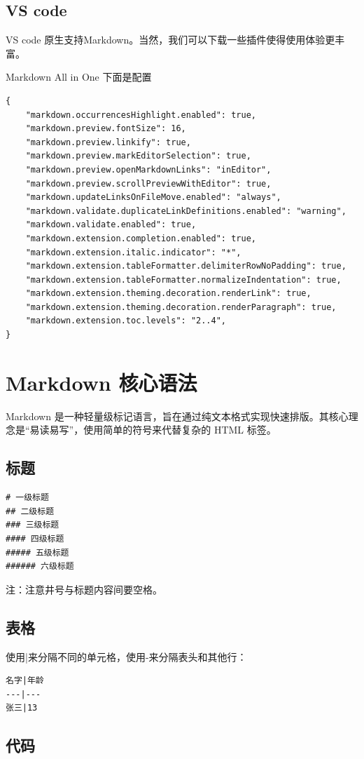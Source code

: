 \documentclass[10pt,a4paper]{book}
\theoremstyle{thmstyle} %
\theoremstyle{defstyle} %
\theoremstyle{prostyle} %
\begin{document}
	\section{VS code}
	VS code 原生支持Markdown。当然，我们可以下载一些插件使得使用体验更丰富。
	\begin{mybox}{Markdown All in One}
			下面是配置
			\begin{lstlisting}
{
	"markdown.occurrencesHighlight.enabled": true,
	"markdown.preview.fontSize": 16,
	"markdown.preview.linkify": true,
	"markdown.preview.markEditorSelection": true,
	"markdown.preview.openMarkdownLinks": "inEditor",
	"markdown.preview.scrollPreviewWithEditor": true,
	"markdown.updateLinksOnFileMove.enabled": "always",
	"markdown.validate.duplicateLinkDefinitions.enabled": "warning",
	"markdown.validate.enabled": true,
	"markdown.extension.completion.enabled": true,
	"markdown.extension.italic.indicator": "*",
	"markdown.extension.tableFormatter.delimiterRowNoPadding": true,
	"markdown.extension.tableFormatter.normalizeIndentation": true,
	"markdown.extension.theming.decoration.renderLink": true,
	"markdown.extension.theming.decoration.renderParagraph": true,
	"markdown.extension.toc.levels": "2..4",
}
			\end{lstlisting}
	\end{mybox}
	
	
	\chapter{Markdown 核心语法}
	Markdown 是一种轻量级标记语言，旨在通过纯文本格式实现快速排版。其核心理念是“易读易写”，使用简单的符号来代替复杂的 HTML 标签。
	\section{标题}
	\begin{lstlisting}
# 一级标题
## 二级标题
### 三级标题
#### 四级标题
##### 五级标题
###### 六级标题
	\end{lstlisting}
注：注意井号与标题内容间要空格。
	
	\section{表格}
	使用|来分隔不同的单元格，使用-来分隔表头和其他行：
	\begin{lstlisting}
名字|年龄
---|---
张三|13
	\end{lstlisting}
	
	\section{代码}
\end{document}
